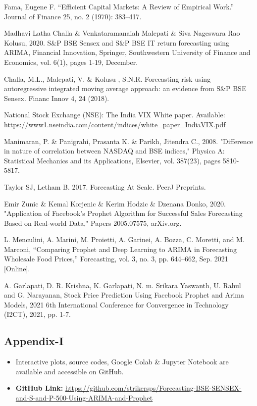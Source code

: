 \documentclass[conference]{IEEEtran}
\begin{document}
\begin{thebibliography}{00}
	 Fama, Eugene F. “Efficient Capital Markets: A Review of Empirical Work.” Journal of Finance 25, no. 2 (1970): 383–417.
	
	 Madhavi Latha Challa \& Venkataramanaiah Malepati \& Siva Nageswara Rao Kolusu, 2020. S\&P BSE Sensex and S\&P BSE IT return forecasting using ARIMA, Financial Innovation, Springer, Southwestern University of Finance and Economics, vol. 6(1), pages 1-19, December.
	
	 Challa, M.L., Malepati, V. \& Kolusu , S.N.R. Forecasting risk using autoregressive integrated moving average approach: an evidence from S\&P BSE Sensex. Financ Innov 4, 24 (2018).
	
	 National Stock Exchange (NSE): The India VIX White paper. Available: \href{https://www1.nseindia.com/content/indices/white\_paper\_IndiaVIX.pdf}{https://www1.nseindia.com/content/indices/white\_paper\_IndiaVIX.pdf}
	
	 Manimaran, P. \& Panigrahi, Prasanta K. \& Parikh, Jitendra C., 2008. "Difference in nature of correlation between NASDAQ and BSE indices," Physica A: Statistical Mechanics and its Applications, Elsevier, vol. 387(23), pages 5810-5817.
	
	 Taylor SJ, Letham B. 2017. Forecasting At Scale. PeerJ Preprints.
	
	 Emir Zunic \& Kemal Korjenic \& Kerim Hodzic \& Dzenana Donko, 2020. "Application of Facebook's Prophet Algorithm for Successful Sales Forecasting Based on Real-world Data," Papers 2005.07575, arXiv.org.
	
	 L. Menculini, A. Marini, M. Proietti, A. Garinei, A. Bozza, C. Moretti, and M. Marconi, “Comparing Prophet and Deep Learning to ARIMA in Forecasting Wholesale Food Prices,” Forecasting, vol. 3, no. 3, pp. 644–662, Sep. 2021 [Online].
	
	 A. Garlapati, D. R. Krishna, K. Garlapati, N. m. Srikara Yaswanth, U. Rahul and G. Narayanan, Stock Price Prediction Using Facebook Prophet and Arima Models, 2021 6th International Conference for Convergence in Technology (I2CT), 2021, pp. 1-7.
	
\end{thebibliography}

\onecolumn
\appendix
\subsection{Appendix-I}
\begin{itemize}
    \item Interactive plots, source codes, Google Colab \& Jupyter Notebook are available and accessible on GitHub.
    \item \textbf{GitHub Link:} \href{https://github.com/strikersps/Forecasting-BSE-SENSEX-and-S-and-P-500-Using-ARIMA-and-Prophet}{https://github.com/strikersps/Forecasting-BSE-SENSEX-and-S-and-P-500-Using-ARIMA-and-Prophet}
\end{itemize}
\end{document}
